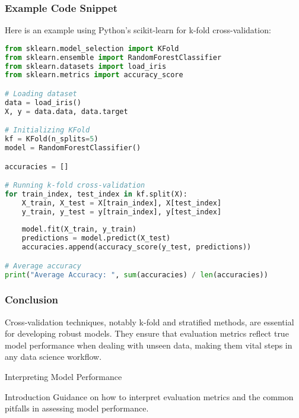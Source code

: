 \documentclass[aspectratio=169]{beamer}
\begin{document}
\begin{frame}[fragile]
    \frametitle{Example Code Snippet}
    Here is an example using Python's scikit-learn for k-fold cross-validation:
    \begin{lstlisting}[language=Python]
from sklearn.model_selection import KFold
from sklearn.ensemble import RandomForestClassifier
from sklearn.datasets import load_iris
from sklearn.metrics import accuracy_score

# Loading dataset
data = load_iris()
X, y = data.data, data.target

# Initializing KFold
kf = KFold(n_splits=5)
model = RandomForestClassifier()

accuracies = []

# Running k-fold cross-validation
for train_index, test_index in kf.split(X):
    X_train, X_test = X[train_index], X[test_index]
    y_train, y_test = y[train_index], y[test_index]
    
    model.fit(X_train, y_train)
    predictions = model.predict(X_test)
    accuracies.append(accuracy_score(y_test, predictions))

# Average accuracy
print("Average Accuracy: ", sum(accuracies) / len(accuracies))
    \end{lstlisting}
\end{frame}

\begin{frame}[fragile]
    \frametitle{Conclusion}
    Cross-validation techniques, notably k-fold and stratified methods, are essential for developing robust models. They ensure that evaluation metrics reflect true model performance when dealing with unseen data, making them vital steps in any data science workflow.
\end{frame}

\begin{frame}[fragile]{Interpreting Model Performance}
    \begin{block}{Introduction}
        Guidance on how to interpret evaluation metrics and the common pitfalls in assessing model performance.
    \end{block}
\end{frame}
\end{document}
